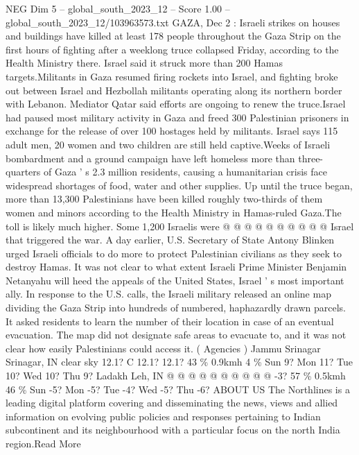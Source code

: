 \begin{textsample}{NEG Dim 5 – global\_south\_2023\_12 – Score 1.00 – global\_south\_2023\_12/103963573.txt}  \label{ex:f5_neg_359}
GAZA, Dec 2 : Israeli strikes on houses and buildings have killed at least 178 people throughout the Gaza Strip on the first hours of fighting after a weeklong truce collapsed Friday, according to the Health Ministry there.
Israel said it struck more than 200 Hamas targets.Militants in Gaza resumed firing rockets into Israel, and fighting broke out between Israel and Hezbollah militants operating along its northern border with Lebanon.
Mediator Qatar said efforts are ongoing to renew the truce.Israel had paused most military activity in Gaza and freed 300 Palestinian prisoners in exchange for the release of over 100 hostages held by militants.
Israel says 115 adult men, 20 women and two children are still held captive.Weeks of Israeli bombardment and a ground campaign have left homeless more than three-quarters of Gaza ' s 2.3 million residents, causing a humanitarian crisis face widespread shortages of food, water and other supplies.
Up until the truce began, more than 13,300 Palestinians have been killed roughly two-thirds of them women and minors according to the Health Ministry in Hamas-ruled Gaza.The toll is likely much higher.
Some 1,200 Israelis were @ @ @ @ @ @ @ @ @ @ Israel that triggered the war.
A day earlier, U.S.
Secretary of State Antony Blinken urged Israeli officials to do more to protect Palestinian civilians as they seek to destroy Hamas.
It was not clear to what extent Israeli Prime Minister Benjamin Netanyahu will heed the appeals of the United States, Israel ' s most important ally.
In response to the U.S. calls, the Israeli military released an online map dividing the Gaza Strip into hundreds of numbered, haphazardly drawn parcels.
It asked residents to learn the number of their location in case of an eventual evacuation.
The map did not designate safe areas to evacuate to, and it was not clear how easily Palestinians could access it. ( Agencies ) Jammu Srinagar Srinagar, IN clear sky 12.1?
C 12.1? 12.1? 43 \% 0.9kmh 4 \% Sun 9?
Mon 11?
Tue 10?
Wed 10?
Thu 9?
Ladakh Leh, IN @ @ @ @ @ @ @ @ @ @ -3? 57 \% 0.5kmh 46 \% Sun -5?
Mon -5?
Tue -4?
Wed -5?
Thu -6?
ABOUT US The Northlines is a leading digital platform covering and disseminating the news, views and allied information on evolving public policies and responses pertaining to Indian subcontinent and its neighbourhood with a particular focus on the north India region.Read More

\end{textsample}
